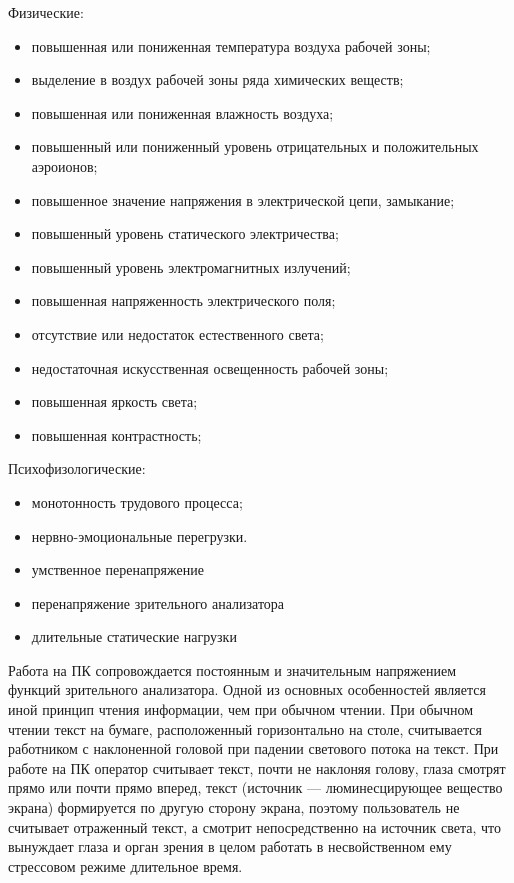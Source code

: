 \noindent Физические:
\begin{itemize}
	\item повышенная или пониженная температура воздуха рабочей зоны;
	\item выделение в воздух рабочей зоны ряда химических веществ;
	\item повышенная или пониженная влажность воздуха;
	\item повышенный или пониженный уровень отрицательных и положительных аэроионов;
	\item повышенное значение напряжения в электрической цепи, замыкание;
	\item повышенный уровень статического электричества;
	\item повышенный уровень электромагнитных излучений;
	\item повышенная напряженность электрического поля;
	\item отсутствие или недостаток естественного света;
	\item недостаточная искусственная освещенность рабочей зоны;
	\item повышенная яркость света;
	\item повышенная контрастность;
\end{itemize}

\noindent Психофизологические:
\begin{itemize}
	\item монотонность трудового процесса;
	\item нервно-эмоциональные перегрузки.
	\item умственное перенапряжение
	\item перенапряжение зрительного анализатора
	\item длительные статические нагрузки
\end{itemize}

Работа на ПК сопровождается постоянным и значительным напряжением функций зрительного анализатора. Одной из основных особенностей является иной принцип чтения информации, чем при обычном чтении. При обычном чтении текст на бумаге, расположенный горизонтально на столе, считывается работником с наклоненной головой при падении светового потока на текст. При работе на ПК оператор считывает текст, почти не наклоняя голову, глаза смотрят прямо или почти прямо вперед, текст (источник — люминесцирующее вещество экрана) формируется по другую сторону экрана, поэтому пользователь не считывает отраженный текст, а смотрит непосредственно на источник света, что вынуждает глаза и орган зрения в целом работать в несвойственном ему стрессовом режиме длительное время.

